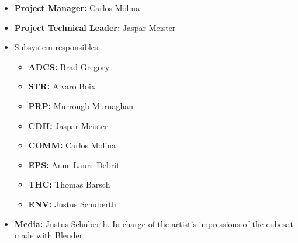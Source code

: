 \begin{itemize}
	\item \textbf{Project Manager:} Carlos Molina
	\item \textbf{Project Technical Leader:} Jaspar Meister
	\item Subsystem responsibles:
	\begin{itemize}
		\item \textbf{ADCS:} Brad Gregory
		\item \textbf{STR:} Alvaro Boix
		\item \textbf{PRP:} Murrough Murnaghan
		\item \textbf{CDH:} Jaspar Meister
		\item \textbf{COMM:} Carlos Molina
		\item \textbf{EPS:} Anne-Laure Debrit
		\item \textbf{THC:} Thomas Barsch
		\item \textbf{ENV:} Justus Schuberth
	\end{itemize}
	\item \textbf{Media:} Justus Schuberth. In charge of the artist's impressions of the cubesat made with Blender.
\end{itemize}
